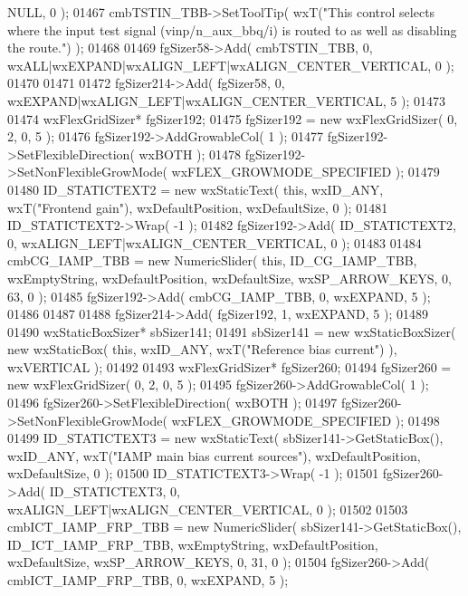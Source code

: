 \begin{DoxyCode}
      NULL, 0 ); 
01467     cmbTSTIN_TBB->SetToolTip( wxT(\textcolor{stringliteral}{"This control selects where the input test signal (vinp/n\_aux\_bbq/i) is
       routed to as well as disabling the route."}) );
01468     
01469     fgSizer58->Add( cmbTSTIN_TBB, 0, wxALL|wxEXPAND|wxALIGN\_LEFT|wxALIGN\_CENTER\_VERTICAL, 0 );
01470     
01471     
01472     fgSizer214->Add( fgSizer58, 0, wxEXPAND|wxALIGN\_LEFT|wxALIGN\_CENTER\_VERTICAL, 5 );
01473     
01474     wxFlexGridSizer* fgSizer192;
01475     fgSizer192 = \textcolor{keyword}{new} wxFlexGridSizer( 0, 2, 0, 5 );
01476     fgSizer192->AddGrowableCol( 1 );
01477     fgSizer192->SetFlexibleDirection( wxBOTH );
01478     fgSizer192->SetNonFlexibleGrowMode( wxFLEX\_GROWMODE\_SPECIFIED );
01479     
01480     ID_STATICTEXT2 = \textcolor{keyword}{new} wxStaticText( \textcolor{keyword}{this}, wxID\_ANY, wxT(\textcolor{stringliteral}{"Frontend gain"}), wxDefaultPosition, 
      wxDefaultSize, 0 );
01481     ID_STATICTEXT2->Wrap( -1 );
01482     fgSizer192->Add( ID_STATICTEXT2, 0, wxALIGN\_LEFT|wxALIGN\_CENTER\_VERTICAL, 0 );
01483     
01484     cmbCG_IAMP_TBB = \textcolor{keyword}{new} NumericSlider( \textcolor{keyword}{this}, ID_CG_IAMP_TBB, wxEmptyString, wxDefaultPosition, 
      wxDefaultSize, wxSP\_ARROW\_KEYS, 0, 63, 0 );
01485     fgSizer192->Add( cmbCG_IAMP_TBB, 0, wxEXPAND, 5 );
01486     
01487     
01488     fgSizer214->Add( fgSizer192, 1, wxEXPAND, 5 );
01489     
01490     wxStaticBoxSizer* sbSizer141;
01491     sbSizer141 = \textcolor{keyword}{new} wxStaticBoxSizer( \textcolor{keyword}{new} wxStaticBox( \textcolor{keyword}{this}, wxID\_ANY, wxT(\textcolor{stringliteral}{"Reference bias current"}) ), 
      wxVERTICAL );
01492     
01493     wxFlexGridSizer* fgSizer260;
01494     fgSizer260 = \textcolor{keyword}{new} wxFlexGridSizer( 0, 2, 0, 5 );
01495     fgSizer260->AddGrowableCol( 1 );
01496     fgSizer260->SetFlexibleDirection( wxBOTH );
01497     fgSizer260->SetNonFlexibleGrowMode( wxFLEX\_GROWMODE\_SPECIFIED );
01498     
01499     ID_STATICTEXT3 = \textcolor{keyword}{new} wxStaticText( sbSizer141->GetStaticBox(), wxID\_ANY, wxT(\textcolor{stringliteral}{"IAMP main bias current
       sources"}), wxDefaultPosition, wxDefaultSize, 0 );
01500     ID_STATICTEXT3->Wrap( -1 );
01501     fgSizer260->Add( ID_STATICTEXT3, 0, wxALIGN\_LEFT|wxALIGN\_CENTER\_VERTICAL, 0 );
01502     
01503     cmbICT_IAMP_FRP_TBB = \textcolor{keyword}{new} NumericSlider( sbSizer141->GetStaticBox(), 
      ID_ICT_IAMP_FRP_TBB, wxEmptyString, wxDefaultPosition, wxDefaultSize, wxSP\_ARROW\_KEYS, 0, 31, 0 );
01504     fgSizer260->Add( cmbICT_IAMP_FRP_TBB, 0, wxEXPAND, 5 );

\end{DoxyCode}
